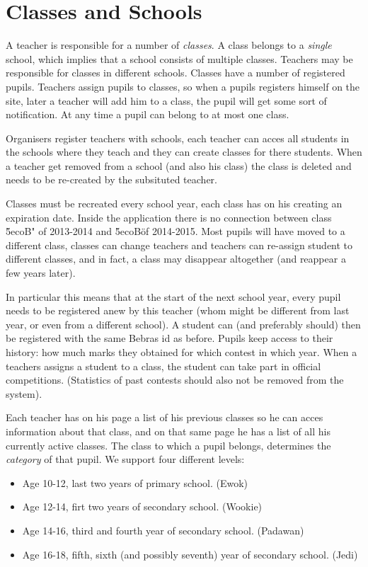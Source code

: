 
\section{Classes and Schools}

A teacher is responsible for a number of \emph{classes}. A class belongs to a \emph{single} school, which implies that a school consists of multiple classes. Teachers may be responsible for classes in different schools. Classes have a number of registered pupils. Teachers assign pupils to classes, so when a pupils registers himself on the site, later a teacher will add him to a class, the pupil will get some sort of notification. At any time a pupil can belong to at most one class. 

Organisers register teachers with schools, each teacher can acces all students in the schools where they teach and they can create classes for there students.
When a teacher get removed from a school (and also his class) the class is deleted and needs to be re-created by the subsituted teacher.

Classes must be recreated every school year, each class has on his creating an expiration date. Inside the application there is no connection between class \"5ecoB" of 2013-2014 and \"5ecoB\" of 2014-2015. Most pupils will have moved to a different class, classes can change teachers and teachers can re-assign student to different classes, and in fact, a class may disappear altogether (and reappear a few years later).

In particular this means that at the start of the next school year, every pupil needs to be registered anew by this teacher (whom might be different from last year, or even from a different school). A student can (and preferably should) then be registered with the same Bebras id as before. Pupils keep access to their history: how much marks they obtained for which contest in which year. 
When a teachers assigns a student to a class, the student can take part in official competitions.
(Statistics of past contests should also not be removed from the system).

Each teacher has on his page a list of his previous classes so he can acces information about that class, and on that same page he has a list of all his currently active classes. 
The class to which a pupil belongs, determines the \emph{category} of that pupil. We support four different levels: \label{levels}
\begin{itemize}
\item Age 10-12, last two years of primary school. (Ewok)
\item Age 12-14, firt two years of secondary school. (Wookie)
\item Age 14-16, third and fourth year of secondary school. (Padawan)
\item Age 16-18, fifth, sixth (and possibly seventh) year of secondary school. (Jedi)
\end{itemize}

